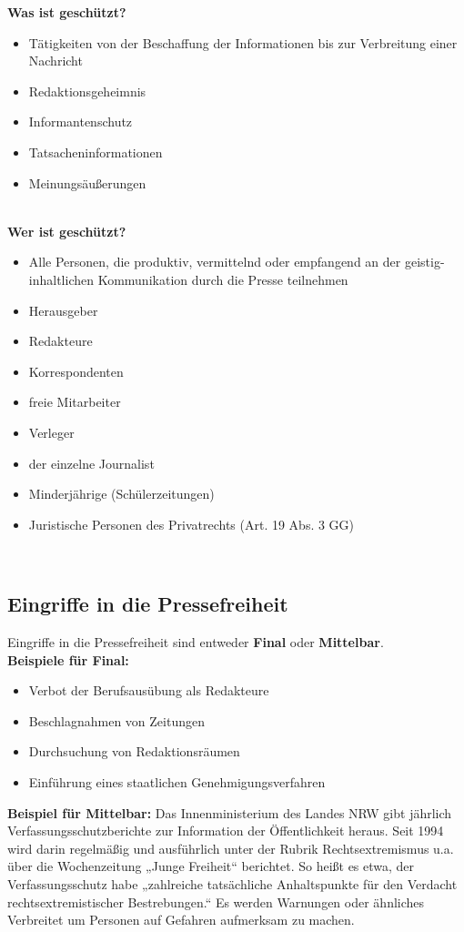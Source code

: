 \newpage
\textbf{Was ist geschützt?}
\begin{itemize}
    \item Tätigkeiten von der Beschaffung der Informationen bis zur Verbreitung einer Nachricht
    \item Redaktionsgeheimnis
    \item Informantenschutz
    \item Tatsacheninformationen
    \item Meinungsäußerungen
\end{itemize}
\qquad\\
\textbf{Wer ist geschützt?}
\begin{itemize}
    \item Alle Personen, die produktiv, vermittelnd oder empfangend an der geistig-inhaltlichen Kommunikation durch die Presse teilnehmen
    \item  Herausgeber
    \item Redakteure
    \item Korrespondenten 
    \item freie Mitarbeiter 
    \item Verleger
    \item der einzelne Journalist
    \item Minderjährige (Schülerzeitungen)
    \item Juristische Personen des Privatrechts (Art. 19 Abs. 3 GG)
\end{itemize}
\qquad\\
\subsection{Eingriffe in die Pressefreiheit}
Eingriffe in die Pressefreiheit sind entweder \textbf{Final} oder \textbf{Mittelbar}. \\
\textbf{Beispiele für Final:}
\begin{itemize}
    \item Verbot der Berufsausübung als Redakteure
    \item Beschlagnahmen von Zeitungen
    \item Durchsuchung von Redaktionsräumen
    \item Einführung eines staatlichen Genehmigungsverfahren
\end{itemize}
\textbf{Beispiel für Mittelbar:}
Das Innenministerium des Landes NRW gibt jährlich Verfassungsschutzberichte zur Information der Öffentlichkeit heraus. Seit 1994 wird darin regelmäßig und ausführlich unter der Rubrik Rechtsextremismus u.a. über die Wochenzeitung „Junge Freiheit“ berichtet. So heißt es etwa, der Verfassungsschutz habe „zahlreiche tatsächliche Anhaltspunkte für den Verdacht rechtsextremistischer Bestrebungen.“ Es werden Warnungen oder ähnliches Verbreitet um Personen auf Gefahren aufmerksam zu machen. 
